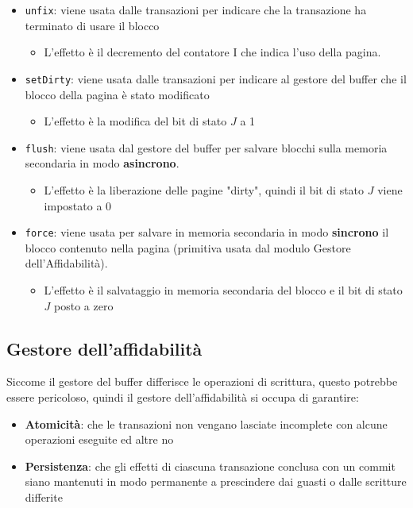 \documentclass[a4paper]{article}
\begin{document}
\begin{itemize}
\begin{enumerate}
      \item Quando una transazione accede ad una pagina per la prima volta il contatore
        si incrementa.
    \end{enumerate}

  \item \texttt{unfix}: viene usata dalle transazioni per indicare che la transazione
    ha terminato di usare il blocco
    \begin{itemize}
      \item L'effetto è il decremento del contatore I che indica l'uso della pagina.
    \end{itemize}

  \item \texttt{setDirty}: viene usata dalle transazioni per indicare al gestore del
    buffer che il blocco della pagina è stato modificato
    \begin{itemize}
      \item L'effetto è la modifica del bit di stato \( J \) a 1
    \end{itemize}

  \item \texttt{flush}: viene usata dal gestore del buffer per salvare blocchi sulla
    memoria secondaria in modo \textbf{asincrono}.
    \begin{itemize}
      \item L'effetto è la liberazione delle pagine "dirty", quindi il bit di stato
        \( J \) viene impostato a 0
    \end{itemize}

  \item \texttt{force}: viene usata per salvare in memoria secondaria in modo
    \textbf{sincrono} il blocco contenuto nella pagina (primitiva usata dal modulo
    Gestore dell’Affidabilità).
    \begin{itemize}
      \item L'effetto è il salvataggio in memoria secondaria del blocco e il bit di
        stato \( J \) posto a zero
    \end{itemize}
\end{itemize}

\subsection{Gestore dell'affidabilità}
Siccome il gestore del buffer differisce le operazioni di scrittura, questo potrebbe
essere pericoloso, quindi il gestore dell'affidabilità si occupa di garantire:
\begin{itemize}
  \item \textbf{Atomicità}: che le transazioni non vengano lasciate incomplete con
    alcune operazioni eseguite ed altre no

  \item \textbf{Persistenza}: che gli effetti di ciascuna transazione conclusa
    con un commit siano mantenuti in modo permanente a prescindere dai guasti
    o dalle scritture differite
\end{itemize}
\end{document}
